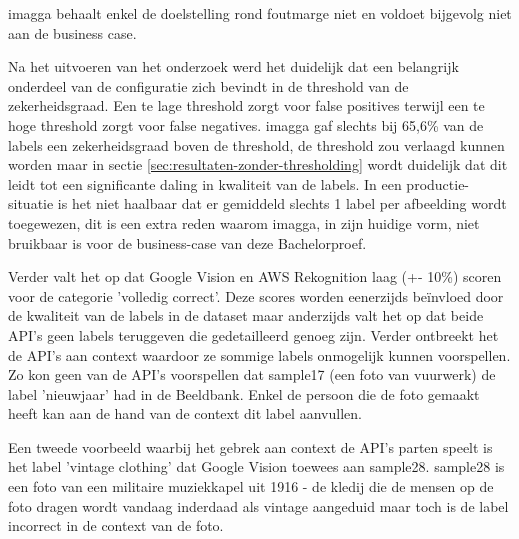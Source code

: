 imagga behaalt enkel de doelstelling rond foutmarge niet en voldoet bijgevolg niet aan de business case.

Na het uitvoeren van het onderzoek werd het duidelijk dat een belangrijk onderdeel van de configuratie zich bevindt in de threshold van de zekerheidsgraad. Een te lage threshold zorgt voor false positives terwijl een te hoge threshold zorgt voor false negatives. imagga gaf slechts bij 65,6\% van de labels een zekerheidsgraad boven de threshold, de threshold zou verlaagd kunnen worden maar in sectie \ref{sec:resultaten-zonder-thresholding} wordt duidelijk dat dit leidt tot een significante daling in kwaliteit van de labels. In een productie-situatie is het niet haalbaar dat er gemiddeld slechts 1 label per afbeelding wordt toegewezen, dit is een extra reden waarom imagga, in zijn huidige vorm, niet bruikbaar is voor de business-case van deze Bachelorproef. 

Verder valt het op dat Google Vision en AWS Rekognition laag (+- 10\%) scoren voor de categorie 'volledig correct'. Deze scores worden eenerzijds beïnvloed door de kwaliteit van de labels in de dataset maar anderzijds valt het op dat beide API's geen labels teruggeven die gedetailleerd genoeg zijn. Verder ontbreekt het de API's aan context waardoor ze sommige labels onmogelijk kunnen voorspellen. 
Zo kon geen van de API's voorspellen dat sample17 (een foto van vuurwerk) de label 'nieuwjaar' had in de Beeldbank.  Enkel de persoon die de foto gemaakt heeft kan aan de hand van de context dit label aanvullen.

Een tweede voorbeeld waarbij het gebrek aan context de API's parten speelt is het label 'vintage clothing' dat Google Vision toewees aan sample28. sample28 is een foto van een militaire muziekkapel uit 1916 - de kledij die de mensen op de foto dragen wordt vandaag inderdaad als vintage aangeduid maar toch is de label incorrect in de context van de foto.